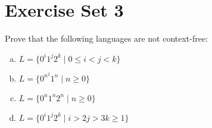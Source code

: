\section{Exercise Set 3}\label{sec:exercise-set-3}

\begin{exercise}{1}
    Prove that the following languages are not context-free:
    \begin{enumerate}[(a)]
        \item \(L=\{0^i1^j2^k \mid 0\leq i < j < k\} \)
        \item \(L=\{0^{n^2}1^n \mid n\geq0\} \)
        \item \(L=\{0^n1^n2^n \mid n\geq0\} \)
        \item \(L=\{0^i1^j2^k \mid i>2j>3k\geq1\} \)
    \end{enumerate}
\end{exercise}


